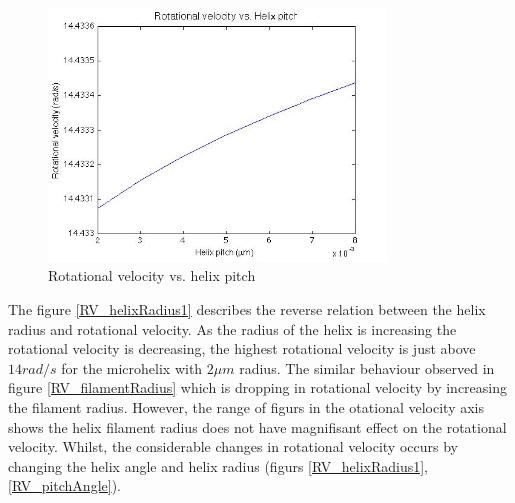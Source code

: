 \documentclass[12pt,a4paper,titlepage]{report}
\begin{document}
\begin{figure}
  \centering
    \includegraphics[width=0.80\textwidth]{RV_helixPitch}
  \caption[Rotational velocity vs. helix pitch]{Rotational velocity vs. helix pitch }
  \label{RV_helixPitch}
\end{figure}

The figure \ref{RV_helixRadius1} describes the reverse relation between the helix radius and rotational
velocity. As the radius of the helix is increasing the rotational velocity is decreasing, the highest rotational
velocity is just above $14 rad/s$ for the microhelix with $2 \mu m$ radius. The similar behaviour observed
in figure \ref{RV_filamentRadius} which is dropping in rotational velocity by increasing the filament radius.
However, the range of figurs in the otational velocity axis shows the helix filament radius does not have
magnifisant effect on the rotational velocity. Whilst, the considerable changes in rotational velocity occurs
by changing the helix angle and helix radius (figurs \ref{RV_helixRadius1}, \ref{RV_pitchAngle}). 
\end{document}
